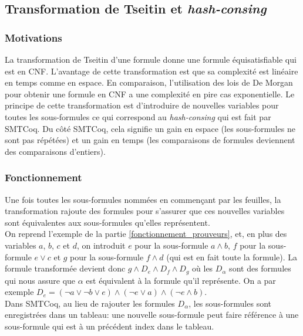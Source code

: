 \documentclass[11pt]{article}
\begin{document}
\subsection{Transformation de Tseitin et \textit{hash-consing}} \label{tseitin}

\subsubsection{Motivations}

La transformation de Tseitin d'une formule donne une formule équisatisfiable qui est en CNF. L'avantage de cette transformation est que sa complexité est linéaire en temps comme en espace. En comparaison, l'utilisation des lois de De Morgan pour obtenir une formule en CNF a une complexité en pire cas exponentielle. Le principe de cette transformation est d'introduire de nouvelles variables pour toutes les sous-formules ce qui correspond au \textit{hash-consing} qui est fait par SMTCoq. Du côté SMTCoq, cela signifie un gain en espace (les sous-formules ne sont pas répétées) et un gain en temps (les comparaisons de formules deviennent des comparaisons d'entiers).

\subsubsection{Fonctionnement}

Une fois toutes les sous-formules nommées en commençant par les feuilles, la transformation rajoute des formules pour s'assurer que ces nouvelles variables sont équivalentes aux sous-formules qu'elles représentent. \\

On reprend l'exemple de la partie \ref{fonctionnement_prouveurs}, et, en plus des variables $a$, $b$, $c$ et $d$, on introduit $e$ pour la sous-formule $a \wedge b$, $f$ pour la sous-formule $e \vee c$ et $g$ pour la sous-formule $f \wedge d$ (qui est en fait toute la formule). La formule transformée devient donc $g \wedge D_e \wedge D_f \wedge D_g$ où les $D_\alpha$ sont des formules qui nous assure que $\alpha$ est équivalent à la formule qu'il représente. On a par exemple $D_e = (\neg a \vee \neg b \vee e) \wedge (\neg e \vee a) \wedge (\neg e \wedge b)$. \\

Dans SMTCoq, au lieu de rajouter les formules $D_\alpha$, les sous-formules sont enregistrées dans un tableau: une nouvelle sous-formule peut faire référence à une sous-formule qui est à un précédent index dans le tableau. 
\end{document}
